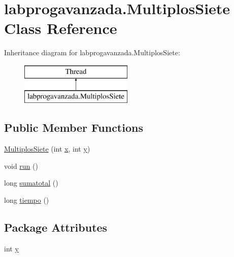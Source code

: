 \hypertarget{classlabprogavanzada_1_1_multiplos_siete}{}\section{labprogavanzada.\+Multiplos\+Siete Class Reference}
\label{classlabprogavanzada_1_1_multiplos_siete}
Inheritance diagram for labprogavanzada.\+Multiplos\+Siete\+:\begin{figure}[H]
\begin{center}
\leavevmode
\includegraphics[height=2.000000cm]{classlabprogavanzada_1_1_multiplos_siete}
\end{center}
\end{figure}
\subsection*{Public Member Functions}
\begin{DoxyCompactItemize}
\item 
\mbox{\hyperlink{classlabprogavanzada_1_1_multiplos_siete_a3fb19a45282517894ab06ba0238a6ad8}{Multiplos\+Siete}} (int \mbox{\hyperlink{classlabprogavanzada_1_1_multiplos_siete_a66b1e8aa9e692a515ca3b2e6a8f9e46f}{x}}, int \mbox{\hyperlink{classlabprogavanzada_1_1_multiplos_siete_a9e6209ca44e838aa9e618a6487f0041f}{y}})
\item 
void \mbox{\hyperlink{classlabprogavanzada_1_1_multiplos_siete_acd03b73ae24d21f7a3c2aeb84f4a0ef1}{run}} ()
\item 
long \mbox{\hyperlink{classlabprogavanzada_1_1_multiplos_siete_ae1e50e7a7f2e4156432a9b638b412539}{sumatotal}} ()
\item 
long \mbox{\hyperlink{classlabprogavanzada_1_1_multiplos_siete_a88623525cbef48cc4908acbb8d86096b}{tiempo}} ()
\end{DoxyCompactItemize}
\subsection*{Package Attributes}
\begin{DoxyCompactItemize}
\item 
int \mbox{\hyperlink{classlabprogavanzada_1_1_multiplos_siete_a9e6209ca44e838aa9e618a6487f0041f}{y}}
\end{DoxyCompactItemize}
